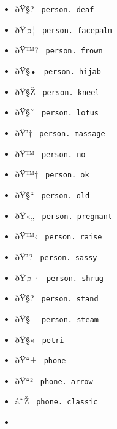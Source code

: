 \begin{itemize}
\item
  \label{symbol-person.deaf}{{ ðŸ§? }
  \texttt{\ person.\ deaf\ }}
\item
  \label{symbol-person.facepalm}{{ ðŸ¤¦ }
  \texttt{\ person.\ facepalm\ }}
\item
  \label{symbol-person.frown}{{ ðŸ™? }
  \texttt{\ person.\ frown\ }}
\item
  \label{symbol-person.hijab}{{ ðŸ§• }
  \texttt{\ person.\ hijab\ }}
\item
  \label{symbol-person.kneel}{{ ðŸ§Ž }
  \texttt{\ person.\ kneel\ }}
\item
  \label{symbol-person.lotus}{{ ðŸ§˜ }
  \texttt{\ person.\ lotus\ }}
\item
  \label{symbol-person.massage}{{ ðŸ'† }
  \texttt{\ person.\ massage\ }}
\item
  \label{symbol-person.no}{{ ðŸ™ }
  \texttt{\ person.\ no\ }}
\item
  \label{symbol-person.ok}{{ ðŸ™† }
  \texttt{\ person.\ ok\ }}
\item
  \label{symbol-person.old}{{ ðŸ§`` }
  \texttt{\ person.\ old\ }}
\item
  \label{symbol-person.pregnant}{{ ðŸ«„ }
  \texttt{\ person.\ pregnant\ }}
\item
  \label{symbol-person.raise}{{ ðŸ™‹ }
  \texttt{\ person.\ raise\ }}
\item
  \label{symbol-person.sassy}{{ ðŸ'? }
  \texttt{\ person.\ sassy\ }}
\item
  \label{symbol-person.shrug}{{ ðŸ¤· }
  \texttt{\ person.\ shrug\ }}
\item
  \label{symbol-person.stand}{{ ðŸ§? }
  \texttt{\ person.\ stand\ }}
\item
  \label{symbol-person.steam}{{ ðŸ§-- }
  \texttt{\ person.\ steam\ }}
\item
  \label{symbol-petri}{{ ðŸ§« } \texttt{\ petri\ }}
\item
  \label{symbol-phone}{{ ðŸ``± } \texttt{\ phone\ }}
\item
  \label{symbol-phone.arrow}{{ ðŸ``² }
  \texttt{\ phone.\ arrow\ }}
\item
  \label{symbol-phone.classic}{{ â˜Ž }
  \texttt{\ phone.\ classic\ }}
\item

\end{itemize}
